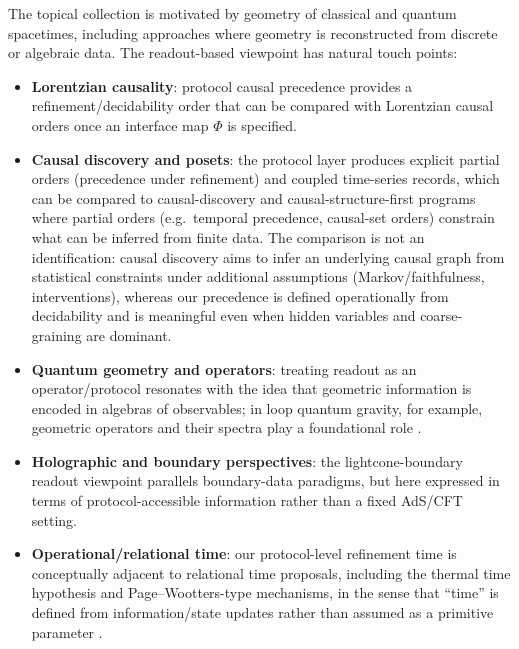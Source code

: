 The topical collection is motivated by geometry of classical and quantum spacetimes, including approaches where geometry is reconstructed from discrete or algebraic data. The readout-based viewpoint has natural touch points:
\begin{itemize}[leftmargin=*,itemsep=2pt]
  \item \textbf{Lorentzian causality}: protocol causal precedence provides a refinement/decidability order that can be compared with Lorentzian causal orders once an interface map $\Phi$ is specified.
  \item \textbf{Causal discovery and posets}: the protocol layer produces explicit partial orders (precedence under refinement) and coupled time-series records, which can be compared to causal-discovery and causal-structure-first programs where partial orders (e.g.\ temporal precedence, causal-set orders) constrain what can be inferred from finite data. The comparison is not an identification: causal discovery aims to infer an underlying causal graph from statistical constraints under additional assumptions (Markov/faithfulness, interventions), whereas our precedence is defined operationally from decidability and is meaningful even when hidden variables and coarse-graining are dominant.\cite{Pearl2009Causality,SpirtesGlymourScheines2001CPS,PetersJanzingSchoelkopf2017}
  \item \textbf{Quantum geometry and operators}: treating readout as an operator/protocol resonates with the idea that geometric information is encoded in algebras of observables; in loop quantum gravity, for example, geometric operators and their spectra play a foundational role \cite{AshtekarLewandowski2004,Thiemann2007}.
  \item \textbf{Holographic and boundary perspectives}: the lightcone-boundary readout viewpoint parallels boundary-data paradigms, but here expressed in terms of protocol-accessible information rather than a fixed AdS/CFT setting.
  \item \textbf{Operational/relational time}: our protocol-level refinement time is conceptually adjacent to relational time proposals, including the thermal time hypothesis and Page--Wootters-type mechanisms, in the sense that ``time'' is defined from information/state updates rather than assumed as a primitive parameter \cite{ConnesRovelli1994,Rovelli2011,PageWootters1983}.
\end{itemize}

